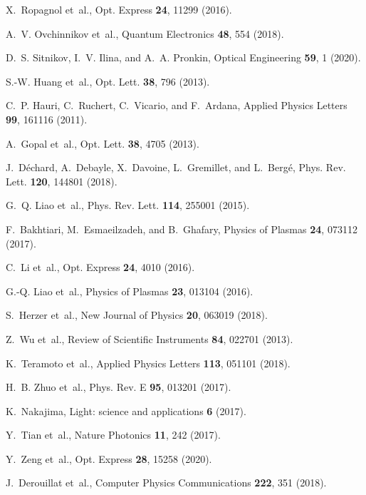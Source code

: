 \documentclass[aps,prl,twocolumn,superscriptaddress]{revtex4-1}
\begin{document}
\begin{thebibliography}{10}
X.~Ropagnol et~al.,
\newblock Opt. Express {\bf 24}, 11299 (2016).

A.~V. Ovchinnikov et~al.,
\newblock Quantum Electronics {\bf 48}, 554 (2018).

D.~S. Sitnikov, I.~V. Ilina, and A.~A. Pronkin,
\newblock Optical Engineering {\bf 59}, 1  (2020).

S.-W. Huang et~al.,
\newblock Opt. Lett. {\bf 38}, 796 (2013).

C.~P. Hauri, C.~Ruchert, C.~Vicario, and F.~Ardana,
\newblock Applied Physics Letters {\bf 99}, 161116 (2011).

A.~Gopal et~al.,
\newblock Opt. Lett. {\bf 38}, 4705 (2013).

J.~D\'echard, A.~Debayle, X.~Davoine, L.~Gremillet, and L.~Berg\'e,
\newblock Phys. Rev. Lett. {\bf 120}, 144801 (2018).

G.~Q. Liao et~al.,
\newblock Phys. Rev. Lett. {\bf 114}, 255001 (2015).

F.~Bakhtiari, M.~Esmaeilzadeh, and B.~Ghafary,
\newblock Physics of Plasmas {\bf 24}, 073112 (2017).

C.~Li et~al.,
\newblock Opt. Express {\bf 24}, 4010 (2016).

G.-Q. Liao et~al.,
\newblock Physics of Plasmas {\bf 23}, 013104 (2016).

S.~Herzer et~al.,
\newblock New Journal of Physics {\bf 20}, 063019 (2018).

Z.~Wu et~al.,
\newblock Review of Scientific Instruments {\bf 84}, 022701 (2013).

K.~Teramoto et~al.,
\newblock Applied Physics Letters {\bf 113}, 051101 (2018).

H.~B. Zhuo et~al.,
\newblock Phys. Rev. E {\bf 95}, 013201 (2017).

K.~Nakajima,
\newblock Light: science and applications {\bf 6} (2017).

Y.~Tian et~al.,
\newblock Nature Photonics {\bf 11}, 242 (2017).

Y.~Zeng et~al.,
\newblock Opt. Express {\bf 28}, 15258 (2020).

J.~Derouillat et~al.,
\newblock Computer Physics Communications {\bf 222}, 351 (2018).

\end{thebibliography}
\end{document}
